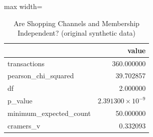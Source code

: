 \begin{table}[htbp]
\centering
\caption{Are Shopping Channels and Membership Independent? (original synthetic data)}
\begingroup
\small
\setlength{\tabcolsep}{6pt}
\renewcommand{\arraystretch}{1.12}
\begin{adjustbox}{max width=\linewidth}
\begin{tabular}{@{}lr@{}}
\toprule
 & value \\
\midrule
transactions & 360.000000 \\
pearson\_chi\_squared & 39.702857 \\
df & 2.000000 \\
p\_value & $2.391300 \times 10^{-9}$ \\
minimum\_expected\_count & 50.000000 \\
cramers\_v & 0.332093 \\
\bottomrule
\end{tabular}
\end{adjustbox}
\endgroup
\end{table}